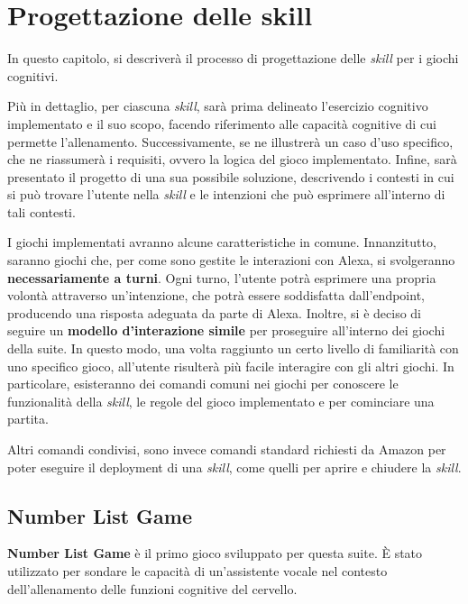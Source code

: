 
\chapter{Progettazione delle skill}
\label{ch:Chapter4}

In questo capitolo, si descriverà il processo di progettazione delle
\textit{skill} per i giochi cognitivi.

Più in dettaglio, per ciascuna \textit{skill}, sarà prima delineato l’esercizio
cognitivo implementato e il suo scopo, facendo riferimento alle capacità
cognitive di cui permette l’allenamento. Successivamente, se ne illustrerà un
caso d’uso specifico, che ne riassumerà i requisiti, ovvero la logica del gioco
implementato. Infine, sarà presentato il progetto di una sua possibile
soluzione, descrivendo i contesti in cui si può trovare l’utente nella
\textit{skill} e le intenzioni che può esprimere all’interno di tali contesti.

I giochi implementati avranno alcune caratteristiche in comune. Innanzitutto,
saranno giochi che, per come sono gestite le interazioni con Alexa, si
svolgeranno \textbf{necessariamente a turni}. Ogni turno, l’utente potrà
esprimere una propria volontà attraverso un’intenzione, che potrà essere
soddisfatta dall’endpoint, producendo una risposta adeguata da parte di Alexa.
Inoltre, si è deciso di seguire un \textbf{modello d'interazione simile} per
proseguire all’interno dei giochi della suite. In questo modo, una volta
raggiunto un certo livello di familiarità con uno specifico gioco, all’utente
risulterà più facile interagire con gli altri giochi. In particolare,
esisteranno dei comandi comuni nei giochi per conoscere le funzionalità della
\textit{skill}, le regole del gioco implementato e per cominciare una partita.

Altri comandi condivisi, sono invece comandi standard richiesti da Amazon per
poter eseguire il deployment di una \textit{skill}, come quelli per aprire e
chiudere la \textit{skill}.

\section{Number List Game}
\label{sec:Sezione4.1}

\textbf{Number List Game} è il primo gioco sviluppato per questa suite. È
stato utilizzato per sondare le capacità di un’assistente vocale nel contesto
dell’allenamento delle funzioni cognitive del cervello.

